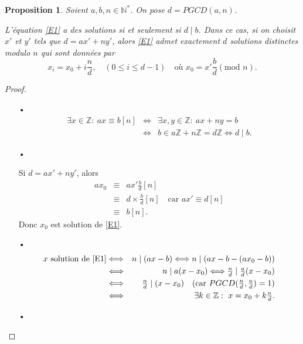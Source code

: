 \documentclass[10pt,a4paper]{report}
\newtheorem{Prop}[thm]{Proposition}
\begin{document}
\begin{Prop}
Soient $a,b,n \in \mathbb{N}^*$. On pose $d=PGCD(a,n)$. \par 
L'équation \eqref{E1} a des solutions si et seulement si $d \mid b$. Dans ce cas, si on choisit $x'$ et $y'$ tels que $d=ax'+ny'$, alors \eqref{E1} admet exactement $d$ solutions distinctes modulo $n$ qui sont données par 
$$ x_i=x_0 +i\frac{n}{d}, \quad (0 \leqslant i \leqslant d-1) \quad \text{où  } x_0=x'\frac{b}{d}(\text{mod }n).      $$
\end{Prop}

\begin{proof}\
\begin{itemize}
\item[•]
\begin{eqnarray*}
\exists x \in \mathbb{Z}:\ ax \equiv b [n] & \Longleftrightarrow & \exists x,y \in \mathbb{Z}: \ ax+ny=b \\
  & \Longleftrightarrow & b \in a \mathbb{Z}+n \mathbb{Z}=d \mathbb{Z} \Longleftrightarrow d \mid b.
\end{eqnarray*}
\item[•] \par 
Si $d=ax'+ny'$, alors \begin{eqnarray*}
ax_0 & \equiv & ax' \tfrac{b}{d} [n] \\
        & \equiv & d \times \tfrac{b}{d} [n] \quad  \text{car } ax'\equiv d [n]\\
        & \equiv & b [n]. 
\end{eqnarray*}
Donc $x_0$ est solution de \eqref{E1}.
\item[•] 
\begin{eqnarray*}
x \text{ solution de }\eqref{E1} &\Longleftrightarrow & n \mid (ax-b) \Longleftrightarrow n \mid (ax-b-(ax_0-b))\\
                             & \Longleftrightarrow & n \mid a(x-x_0) \Longleftrightarrow \tfrac{n}{d} \mid \tfrac{a}{d}(x-x_0) \\
                             & \Longleftrightarrow & \tfrac{n}{d} \mid (x-x_0) \quad  (\text{car }  PGCD(\tfrac{n}{d},\tfrac{a}{d})=1  )\\
                             & \Longleftrightarrow & \exists k \in \mathbb{Z}: \ x=x_0+k \tfrac{n}{d}.
\end{eqnarray*}
\item[•] \par 

\end{itemize}
\end{proof}
\end{document}
